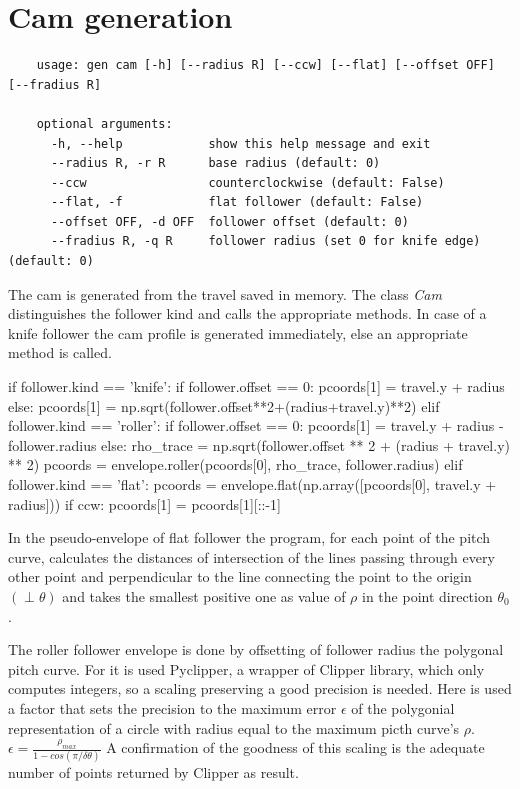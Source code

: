 \documentclass[a4paper,10pt,twoside]{article}
\begin{document}
\section{Cam generation}
    \begin{verbatim}
    usage: gen cam [-h] [--radius R] [--ccw] [--flat] [--offset OFF] [--fradius R]

    optional arguments:
      -h, --help            show this help message and exit
      --radius R, -r R      base radius (default: 0)
      --ccw                 counterclockwise (default: False)
      --flat, -f            flat follower (default: False)
      --offset OFF, -d OFF  follower offset (default: 0)
      --fradius R, -q R     follower radius (set 0 for knife edge) (default: 0)
    \end{verbatim}

    The cam is generated from the travel saved in memory.
    The class \emph{Cam} distinguishes the follower kind and calls the appropriate methods.
    In case of a knife follower the cam profile is generated immediately, else an appropriate method is called.

    \begin{pycode}
    if follower.kind == 'knife':
        if follower.offset == 0:
            pcoords[1] = travel.y + radius
        else:
            pcoords[1] = np.sqrt(follower.offset**2+(radius+travel.y)**2)
    elif follower.kind == 'roller':
        if follower.offset == 0:
            pcoords[1] = travel.y + radius - follower.radius
        else:
            rho_trace = np.sqrt(follower.offset ** 2 + (radius + travel.y) ** 2)
            pcoords = envelope.roller(pcoords[0], rho_trace, follower.radius)
    elif follower.kind == 'flat':
        pcoords = envelope.flat(np.array([pcoords[0], travel.y + radius]))
    if ccw:
        pcoords[1] = pcoords[1][::-1]
    \end{pycode}

    In the pseudo-envelope of flat follower the program, for each point of the pitch curve,
    calculates the distances of intersection of the lines passing through every other point
    and perpendicular to the line connecting the point to the origin \((\perp \theta)\)
    and takes the smallest positive one as value of \(\rho\) in the point direction \(\theta_0\).

    The roller follower envelope is done by offsetting of follower radius the polygonal pitch curve.
    For it is used Pyclipper, a wrapper of Clipper library, which only computes integers,
    so a scaling preserving a good precision is needed. Here is used a factor that sets the precision to
    the maximum error \(\epsilon\) of the polygonial representation of a circle with radius equal to
    the maximum picth curve's \(\rho\).\hfill\(\epsilon=\frac{\rho_{max}}{1-cos(\pi/\delta\theta)}\)
    A confirmation of the goodness of this scaling is the adequate number of points returned by Clipper as result.
\end{document}
